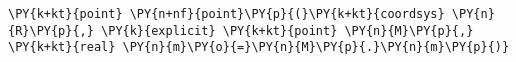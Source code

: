 \begin{Verbatim}[commandchars=\\\{\}]
    \PY{k+kt}{point} \PY{n+nf}{point}\PY{p}{(}\PY{k+kt}{coordsys} \PY{n}{R}\PY{p}{,} \PY{k}{explicit} \PY{k+kt}{point} \PY{n}{M}\PY{p}{,} \PY{k+kt}{real} \PY{n}{m}\PY{o}{=}\PY{n}{M}\PY{p}{.}\PY{n}{m}\PY{p}{)}
\end{Verbatim}
